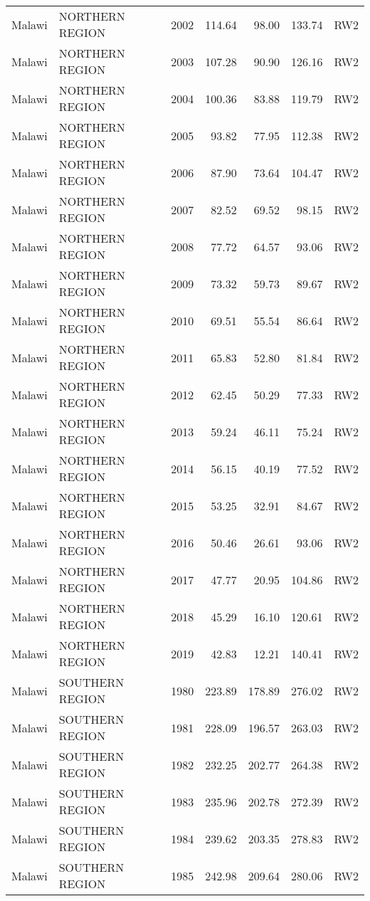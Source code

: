\begin{longtable}{lllrrrl}
  Malawi & NORTHERN REGION & 2002 & 114.64 & 98.00 & 133.74 & RW2 \\ 
  Malawi & NORTHERN REGION & 2003 & 107.28 & 90.90 & 126.16 & RW2 \\ 
  Malawi & NORTHERN REGION & 2004 & 100.36 & 83.88 & 119.79 & RW2 \\ 
  Malawi & NORTHERN REGION & 2005 & 93.82 & 77.95 & 112.38 & RW2 \\ 
  Malawi & NORTHERN REGION & 2006 & 87.90 & 73.64 & 104.47 & RW2 \\ 
  Malawi & NORTHERN REGION & 2007 & 82.52 & 69.52 & 98.15 & RW2 \\ 
  Malawi & NORTHERN REGION & 2008 & 77.72 & 64.57 & 93.06 & RW2 \\ 
  Malawi & NORTHERN REGION & 2009 & 73.32 & 59.73 & 89.67 & RW2 \\ 
  Malawi & NORTHERN REGION & 2010 & 69.51 & 55.54 & 86.64 & RW2 \\ 
  Malawi & NORTHERN REGION & 2011 & 65.83 & 52.80 & 81.84 & RW2 \\ 
  Malawi & NORTHERN REGION & 2012 & 62.45 & 50.29 & 77.33 & RW2 \\ 
  Malawi & NORTHERN REGION & 2013 & 59.24 & 46.11 & 75.24 & RW2 \\ 
  Malawi & NORTHERN REGION & 2014 & 56.15 & 40.19 & 77.52 & RW2 \\ 
  Malawi & NORTHERN REGION & 2015 & 53.25 & 32.91 & 84.67 & RW2 \\ 
  Malawi & NORTHERN REGION & 2016 & 50.46 & 26.61 & 93.06 & RW2 \\ 
  Malawi & NORTHERN REGION & 2017 & 47.77 & 20.95 & 104.86 & RW2 \\ 
  Malawi & NORTHERN REGION & 2018 & 45.29 & 16.10 & 120.61 & RW2 \\ 
  Malawi & NORTHERN REGION & 2019 & 42.83 & 12.21 & 140.41 & RW2 \\ 
  Malawi & SOUTHERN REGION & 1980 & 223.89 & 178.89 & 276.02 & RW2 \\ 
  Malawi & SOUTHERN REGION & 1981 & 228.09 & 196.57 & 263.03 & RW2 \\ 
  Malawi & SOUTHERN REGION & 1982 & 232.25 & 202.77 & 264.38 & RW2 \\ 
  Malawi & SOUTHERN REGION & 1983 & 235.96 & 202.78 & 272.39 & RW2 \\ 
  Malawi & SOUTHERN REGION & 1984 & 239.62 & 203.35 & 278.83 & RW2 \\ 
  Malawi & SOUTHERN REGION & 1985 & 242.98 & 209.64 & 280.06 & RW2 \\ 

\end{longtable}
